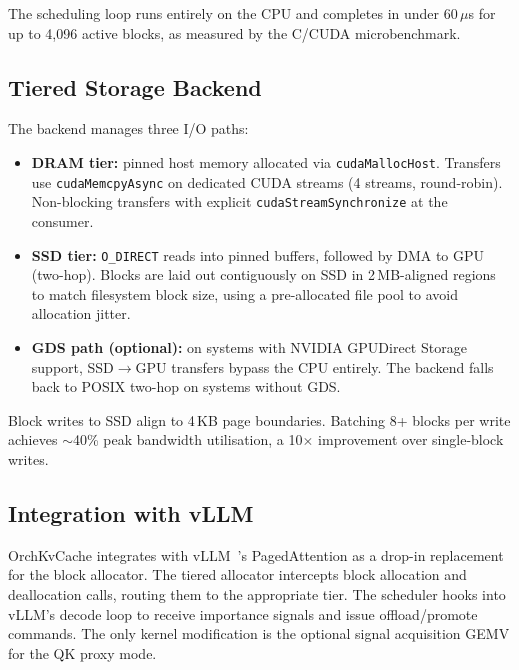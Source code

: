 \documentclass[acmsmall,nonacm,screen]{acmart}
\newcommand{\sys}{OrchKvCache}
\begin{document}
The scheduling loop runs entirely on the CPU and completes in under
60\,$\mu$s for up to 4{,}096 active blocks, as measured by the C/CUDA
microbenchmark.

\subsection{Tiered Storage Backend}\label{sec:design:backend}

The backend manages three I/O paths:

\begin{itemize}
  \item \textbf{DRAM tier:} pinned host memory allocated via
    \texttt{cudaMallocHost}.  Transfers use \texttt{cudaMemcpyAsync} on
    dedicated CUDA streams (4 streams, round-robin).  Non-blocking transfers
    with explicit \texttt{cudaStreamSynchronize} at the consumer.

  \item \textbf{SSD tier:} \texttt{O\_DIRECT} reads into pinned buffers,
    followed by DMA to GPU (two-hop).  Blocks are laid out contiguously
    on SSD in 2\,MB-aligned regions to match filesystem block size,
    using a pre-allocated file pool to avoid allocation jitter.

  \item \textbf{GDS path (optional):} on systems with NVIDIA GPUDirect
    Storage~\cite{nvidia2023gds} support, SSD$\to$GPU transfers bypass
    the CPU entirely.  The backend falls back to POSIX two-hop on systems
    without GDS.
\end{itemize}

Block writes to SSD align to 4\,KB page boundaries.  Batching 8+ blocks
per write achieves ${\sim}$40\% peak bandwidth utilisation, a 10$\times$
improvement over single-block writes.

\subsection{Integration with vLLM}\label{sec:design:production}

\sys{} integrates with vLLM~\cite{kwon2023vllm}'s PagedAttention as a
drop-in replacement for the block allocator.  The tiered allocator intercepts
block allocation and deallocation calls, routing them to the appropriate
tier.  The scheduler hooks into vLLM's decode loop to receive importance
signals and issue offload/promote commands.  The only kernel modification is
the optional signal acquisition GEMV for the QK proxy mode.
\end{document}
